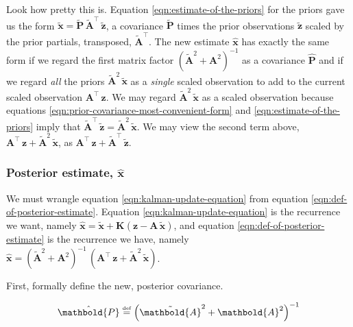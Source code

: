 \documentclass[10pt,oneside,x11names]{article}
\begin{document}
Look how pretty this is. Equation \ref{eqn:estimate-of-the-priors} for the
priors gave us the form
\(\tilde{\mathbold{x}}= \tilde{\mathbold{P}}\,
\tilde{\mathbold{A}}^\intercal\,\tilde{\mathbold{z}}\), a covariance 
\(\tilde{\mathbold{P}}\)
times  the prior observations 
\(\tilde{\mathbold{z}}\)
scaled by the prior partials, transposed, 
\(\tilde{\mathbold{A}}^\intercal\). 
The new estimate \(\hat{\mathbold{x}}\) has exactly
the same form if we regard the first matrix factor
\(\left({\tilde{\mathbold{A}}}^2 + \mathbold{A}^2 \right)^{-1}\) 
as a  covariance
\(\hat{\mathbold{P}}\)  and if
we regard \emph{all} the priors \({\tilde{\mathbold{A}}}^2\,{\tilde{\mathbold{x}}}\) as a \emph{single}
scaled observation
to add to the current scaled observation \(\mathbold{A}^\intercal\,\mathbold{z}\).
We may regard \({\tilde{\mathbold{A}}^2}\,\tilde{\mathbold{x}}\) as a scaled
observation because
equations
\ref{eqn:prior-covariance-most-convenient-form}
and
\ref{eqn:estimate-of-the-priors}
imply that
\({\tilde{\mathbold{A}}^\intercal}\,\tilde{\mathbold{z}}={\tilde{\mathbold{A}}^2}\,\tilde{\mathbold{x}}\). 
We may view the second term above,
\(\mathbold{A}^\intercal\,
\mathbold{z} + 
{\tilde{\mathbold{A}}}^2\,
{\tilde{\mathbold{x}}}\), 
as
\(\mathbold{A}^\intercal\,
\mathbold{z} + 
{\tilde{\mathbold{A}}}^\intercal\,
{\tilde{\mathbold{z}}}\).

\subsubsection{Posterior estimate, \(\hat{\mathbold{x}}\)}
\label{sec:orgheadline12}

We must wrangle 
equation
\ref{eqn:kalman-update-equation}
from
equation
\ref{eqn:def-of-posterior-estimate}.
Equation 
\ref{eqn:kalman-update-equation}
is the recurrence we want,
namely 
\(\hat{\mathbold{x}}=\tilde{\mathbold{x}}+\mathbold{K}(\mathbold{z}-\mathbold{A}\,\tilde{\mathbold{x}})\),
and equation
\ref{eqn:def-of-posterior-estimate}
is the recurrence we have, namely\\
\(\hat{\mathbold{x}}
=
\left(
{\tilde{\mathbold{A}}}^2 + 
\mathbold{A}^2
\right)^{-1}\,
\left(
\mathbold{A}^\intercal\,
\mathbold{z} + 
{\tilde{\mathbold{A}}}^2\,
{\tilde{\mathbold{x}}}
\right)\).

First, formally define the new, posterior covariance.

\begin{equation}
\label{eqn:new-p-hat-definition}
{\hat{\mathbold{P}}}
\stackrel{\text{\tiny def}}{=}
\left(
{\tilde{\mathbold{A}}}^2 + \mathbold{A}^2
\right)^{-1}
\end{equation}
\end{document}
